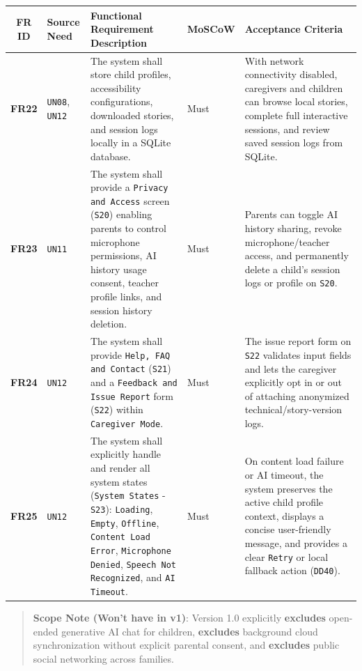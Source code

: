 \begin{footnotesize}
\noindent\begin{xltabular}{\textwidth}{|c|p{2.2cm}|X|p{2.0cm}|p{2.4cm}|}
\hline
\textbf{FR ID} & \textbf{Source Need} & \textbf{Functional Requirement Description} & \textbf{MoSCoW} & \textbf{Acceptance Criteria} \\ \hline
\endhead
\textbf{FR22} & \texttt{UN08}, \texttt{UN12} & The system shall store child profiles, accessibility configurations, downloaded stories, and session logs locally in a SQLite database. & Must & With network connectivity disabled, caregivers and children can browse local stories, complete full interactive sessions, and review saved session logs from SQLite. \\ \hline
\textbf{FR23} & \texttt{UN11} & The system shall provide a \texttt{Privacy and Access} screen (\texttt{S20}) enabling parents to control microphone permissions, AI history usage consent, teacher profile links, and session history deletion. & Must & Parents can toggle AI history sharing, revoke microphone/teacher access, and permanently delete a child's session logs or profile on \texttt{S20}. \\ \hline
\textbf{FR24} & \texttt{UN12} & The system shall provide \texttt{Help, FAQ and Contact} (\texttt{S21}) and a \texttt{Feedback and Issue Report} form (\texttt{S22}) within \texttt{Caregiver Mode}. & Must & The issue report form on \texttt{S22} validates input fields and lets the caregiver explicitly opt in or out of attaching anonymized technical/story-version logs. \\ \hline
\textbf{FR25} & \texttt{UN12} & The system shall explicitly handle and render all system states (\texttt{System States} - \texttt{S23}): \texttt{Loading}, \texttt{Empty}, \texttt{Offline}, \texttt{Content Load Error}, \texttt{Microphone Denied}, \texttt{Speech Not Recognized}, and \texttt{AI Timeout}. & Must & On content load failure or AI timeout, the system preserves the active child profile context, displays a concise user-friendly message, and provides a clear \texttt{Retry} or local fallback action (\texttt{DD40}). \\ \hline
\end{xltabular}
\end{footnotesize}


\begin{quote}
\textbf{Scope Note (Won't have in v1)}: Version 1.0 explicitly \textbf{excludes} open-ended generative AI chat for children, \textbf{excludes} background cloud synchronization without explicit parental consent, and \textbf{excludes} public social networking across families.
\end{quote}



